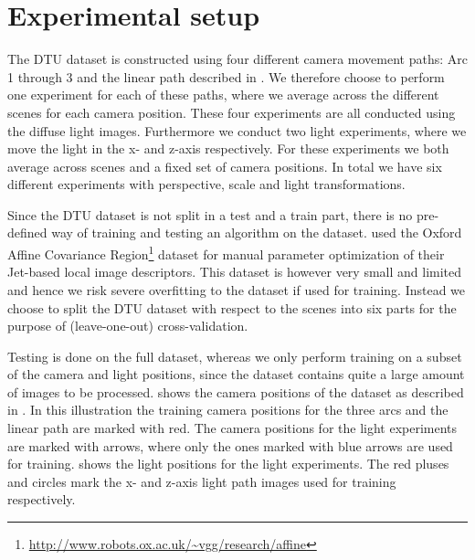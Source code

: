 \documentclass[thesis.tex]{subfiles}
\begin{document}
\section{Experimental setup}
%
The DTU dataset is constructed using four different camera movement paths: Arc 1 through 3 and the linear path described in . We therefore choose to perform one experiment for each of these paths, where we average across the different scenes for each camera position. These four experiments are all conducted using the diffuse light images. Furthermore we conduct two light experiments, where we move the light in the x- and z-axis respectively. For these experiments we both average across scenes and a fixed set of camera positions. In total we have six different experiments with perspective, scale and light transformations.

Since the DTU dataset is not split in a test and a train part, there is no pre-defined way of training and testing an algorithm on the dataset. \citet{larsen2012jet} used the Oxford Affine Covariance Region\footnote{\url{http://www.robots.ox.ac.uk/~vgg/research/affine}} dataset for manual parameter optimization of their Jet-based local image descriptors. This dataset is however very small and limited and hence we risk severe overfitting to the dataset if used for training. Instead we choose to split the DTU dataset with respect to the scenes into six parts for the purpose of (leave-one-out) cross-validation.

Testing is done on the full dataset, whereas we only perform training on a subset of the camera and light positions, since the dataset contains quite a large amount of images to be processed.  shows the camera positions of the dataset as described in . In this illustration the training camera positions for the three arcs and the linear path are marked with red. The camera positions for the light experiments are marked with arrows, where only the ones marked with blue arrows are used for training.  shows the light positions for the light experiments. The red pluses and circles mark the x- and z-axis light path images used for training respectively.
%
\end{document}
